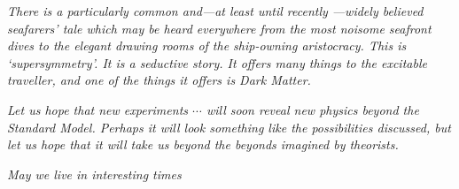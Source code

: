 
\begin{dedication} 

\textit{There is a particularly common and---at least until recently	---widely believed seafarers’ tale which may be heard everywhere from the most noisome seafront dives to the elegant drawing rooms of the ship-owning aristocracy. This is ‘supersymmetry’. It is a seductive story. It offers many things to the excitable traveller,	 and	 one of the things it offers is Dark Matter. }

\textit{Let us hope that new experiments $\cdots$ will soon reveal new physics beyond the Standard Model. Perhaps it will look something like the possibilities discussed, but let us hope that it will take us beyond the beyonds imagined by theorists.
}

\textit{May we live in interesting times
}

\end{dedication}

